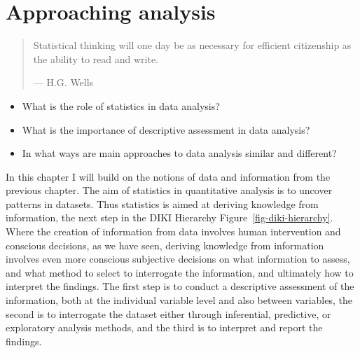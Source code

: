 \documentclass[
  letterpaper,
]{scrbook}
\providecommand{\tightlist}{%
  \setlength{\itemsep}{0pt}\setlength{\parskip}{0pt}}\usepackage{longtable,booktabs,array}
\begin{document}
\hypertarget{sec-approaching-analysis}{%
\chapter{Approaching analysis}\label{sec-approaching-analysis}}

\begin{quote}
Statistical thinking will one day be as necessary for efficient
citizenship as the ability to read and write.

--- H.G. Wells
\end{quote}

\begin{tcolorbox}[enhanced jigsaw, title=\textcolor{quarto-callout-note-color}{\faInfo}\hspace{0.5em}{Keys}, breakable, colback=white, colframe=quarto-callout-note-color-frame, bottomrule=.15mm, left=2mm, bottomtitle=1mm, colbacktitle=quarto-callout-note-color!10!white, opacityback=0, arc=.35mm, toprule=.15mm, coltitle=black, leftrule=.75mm, opacitybacktitle=0.6, toptitle=1mm, titlerule=0mm, rightrule=.15mm]

\begin{itemize}
\tightlist
\item
  What is the role of statistics in data analysis?
\item
  What is the importance of descriptive assessment in data analysis?
\item
  In what ways are main approaches to data analysis similar and
  different?
\end{itemize}

\end{tcolorbox}

In this chapter I will build on the notions of data and information from
the previous chapter. The aim of statistics in quantitative analysis is
to uncover patterns in datasets. Thus statistics is aimed at deriving
knowledge from information, the next step in the DIKI Hierarchy
Figure~\ref{fig-diki-hierarchy}. Where the creation of information from
data involves human intervention and conscious decisions, as we have
seen, deriving knowledge from information involves even more conscious
subjective decisions on what information to assess, and what method to
select to interrogate the information, and ultimately how to interpret
the findings. The first step is to conduct a descriptive assessment of
the information, both at the individual variable level and also between
variables, the second is to interrogate the dataset either through
inferential, predictive, or exploratory analysis methods, and the third
is to interpret and report the findings.
\end{document}
